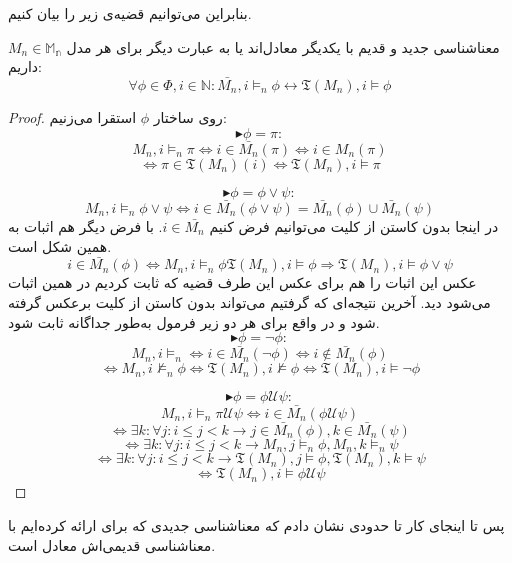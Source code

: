 بنابراین می‌توانیم قضیه‌ی زیر را بیان کنیم.
\begin{thm}
	معناشناسی جدید و قدیم با یکدیگر معادل‌اند یا به عبارت دیگر 
	برای هر مدل $M_n \in \mathbb{M_n}$ داریم:
	$$\forall \phi \in \Phi, i\in\mathbb{N}:\bar{M_n},i \models_n \phi \leftrightarrow \mathfrak{T}(M_n) , i \models \phi $$
\end{thm}

\begin{proof}
	روی ساختار $\phi$ استقرا می‌زنیم:
	$$\blacktriangleright \phi=\pi:$$
	$$M_n , i \models_n \pi \iff i \in \bar{M_n} (\pi) \iff i \in M_n(\pi)$$
	$$\iff \pi \in \mathfrak{T}(M_n)(i) \iff \mathfrak{T}(M_n),i \models \pi $$
	
	$$\blacktriangleright \phi=\phi \lor \psi:$$
	$$M_n , i \models_n \phi \lor \psi  \iff i\in \bar{M_n}(\phi \lor \psi) = \bar{M_n} (\phi) \cup \bar{M_n}(\psi)$$
	در اینجا بدون کاستن از کلیت می‌توانیم فرض کنیم $i \in \bar{M_n}$. با فرض دیگر هم اثبات به همین شکل است.
	$$i \in \bar{M_n}(\phi) \iff M_n,i\models_n \phi \mathfrak{T}(M_n),i \models \phi \Rightarrow \mathfrak{T}(M_n),i\models \phi \lor \psi$$
	عکس این اثبات را هم برای عکس این طرف قضیه که ثابت کردیم در همین اثبات می‌شود دید. آخرین نتیجه‌ای که گرفتیم می‌تواند بدون کاستن از کلیت برعکس گرفته شود و در واقع برای هر دو زیر فرمول به‌طور جداگانه ثابت شود.
	$$\blacktriangleright \phi=\neg \phi:$$
	$$M_n,i \models_n \iff i \in \bar{M_n}(\neg \phi) \iff i \notin \bar{M_n}(\phi)$$
	$$\iff M_n ,i \nvDash_n \phi \iff \mathfrak{T}(M_n),i \nvDash \phi \iff \mathfrak{T} (M_n) ,i \models \neg \phi$$ 
	
	$$\blacktriangleright \phi=\phi \mathcal{U} \psi:$$
	$$M_n,i \models_n \pi \mathcal{U} \psi \iff i \in \bar{M_n}(\phi \mathcal{U}\psi)$$
	$$\iff \exists k: \forall j: i \leq j < k \rightarrow j \in \bar{M_n}(\phi) , k \in \bar{M_n}(\psi)$$
	$$\iff \exists k: \forall j: i \leq j < k \rightarrow M_n,j \models_n\phi ,  M_n,k\models_n \psi$$
	$$\iff \exists k: \forall j: i \leq j < k \rightarrow \mathfrak{T}(M_n),j \models\phi ,  \mathfrak{T}(M_n),k\models \psi$$
	$$\iff \mathfrak{T}(M_n),i \models \phi \mathcal{U} \psi$$
	
\end{proof}

پس تا اینجای کار تا حدودی نشان دادم که معناشناسی جدیدی که برای  ارائه کرده‌ایم با معناشناسی قدیمی‌اش معادل است. 

